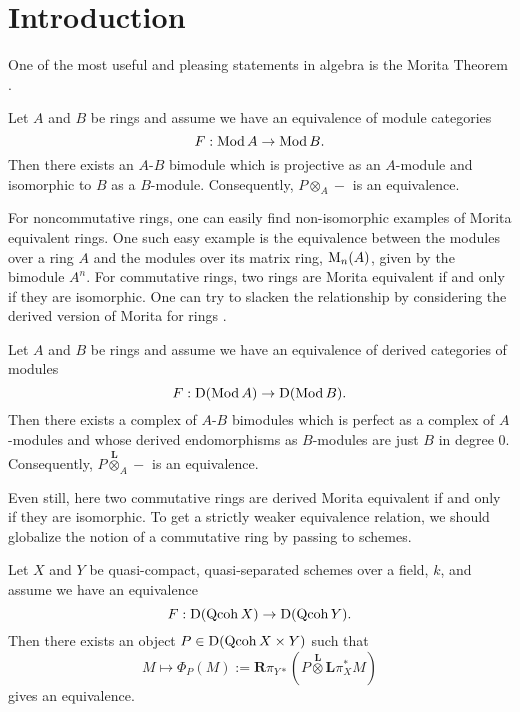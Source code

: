 \chapter*{Introduction}
One of the most useful and pleasing statements in algebra is the Morita Theorem \parencite{Morita}.

\begin{theorem}
  Let \(A\) and \(B\) be rings and assume we have an equivalence of module categories 
  \begin{displaymath}
    F : \operatorname{Mod}A \to \operatorname{Mod}B.
  \end{displaymath}
  Then there exists an \(A\)-\(B\) bimodule which is projective as an \(A\)-module and isomorphic to \(B\) as a \(B\)-module. Consequently, \(P \otimes_A -\) is an equivalence. 
\end{theorem}

For noncommutative rings, one can easily find non-isomorphic examples of Morita equivalent rings.
One such easy example is the equivalence between the modules over a ring \(A\) and the modules over its matrix ring, \(\operatorname{M}_n(A)\), given by the bimodule \(A^n\).
For commutative rings, two rings are Morita equivalent if and only if they are isomorphic. One can try to slacken the relationship by considering the derived version of Morita for rings \parencite{Rickard}.

\begin{theorem}
  Let \(A\) and \(B\) be rings and assume we have an equivalence of derived categories of modules
  \begin{displaymath}
    F : \mathrm{D}(\operatorname{Mod}A) \to \mathrm{D}(\operatorname{Mod}B).
  \end{displaymath}
  Then there exists a complex of \(A\)-\(B\) bimodules which is perfect as a complex of \(A\)-modules and whose derived endomorphisms as \(B\)-modules are just \(B\) in degree \(0\). Consequently, \(P \overset{\mathbf{L}}{\otimes}_A -\) is an equivalence. 
\end{theorem}

Even still, here two commutative rings are derived Morita equivalent if and only if they are isomorphic. To get a strictly weaker equivalence relation, we should globalize the notion of a commutative ring by passing to schemes. 

\begin{theorem}
  Let \(X\) and \(Y\) be quasi-compact, quasi-separated schemes over a field, \(k\), and assume we have an equivalence 
  \begin{displaymath}
    F: \mathrm{D}(\operatorname{Qcoh}X) \to \mathrm{D}(\operatorname{Qcoh}Y).
  \end{displaymath}
  Then there exists an object \(P \in \mathrm{D}(\operatorname{Qcoh}X \times Y)\) such that
  \begin{displaymath}
    M \mapsto \Phi_P (M) := \mathbf{R}\pi_{Y \ast} \left( P \overset{\mathbf{L}}{\otimes} \mathbf{L}\pi_X^\ast M \right) 
  \end{displaymath}
  gives an equivalence. 
\end{theorem}

